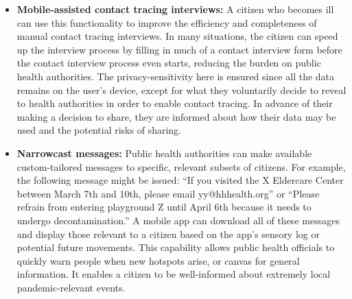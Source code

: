 \begin{itemize}
\item \textbf{Mobile-assisted contact tracing interviews:}  A citizen who becomes ill can use this functionality to improve the efficiency and completeness of manual contact tracing interviews.  In many situations, the citizen can speed up the interview process by filling in much of a contact interview form before the contact interview process even starts, reducing the burden on public health authorities.  The privacy-sensitivity here is ensured since all the data remains on the user's device, except for what they voluntarily decide to reveal to health authorities in order to enable contact tracing. In advance of their making a decision to share, they are informed about how their data may be used and the potential risks of sharing. 

\item \textbf{Narrowcast messages:}  Public health authorities can make available custom-tailored messages to specific, relevant subsets of citizens.  For example, the following message might be issued: ``If you visited the X Eldercare Center between March 7th and 10th, please email yy@hhhealth.org'' or ``Please refrain from entering playground Z until April 6th because it needs to undergo decontamination.''  A mobile app can download all of these messages and display those relevant to a citizen based on the app's sensory log or potential future movements.  This capability allows public health officials to quickly warn people when new hotspots arise, or canvas for general information.  It enables a citizen to be well-informed about extremely local pandemic-relevant events.  


\end{itemize}
